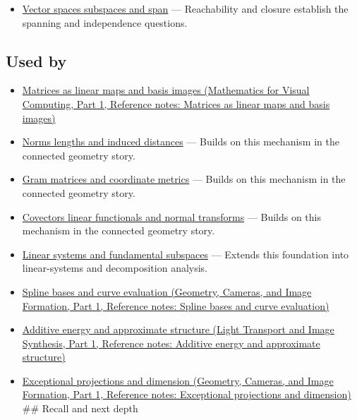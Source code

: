 \begin{itemize}
\tightlist
\item
  \hyperref[appendix-173b52c063ae]{Vector spaces subspaces and span} --- Reachability and closure establish the spanning and independence questions.
\end{itemize}

\subsection{Used by}\label{appendix-ce0341f7ea0d-used-by}

\hypertarget{appendix-ce0341f7ea0d-used-by}{}

\begin{itemize}
\item
  \href{../02-Mathematics-for-Visual-Computing-P01/main.pdf\#appendix-bd39c3bf5d64}{Matrices as linear maps and basis images (Mathematics for Visual Computing, Part 1, Reference notes: Matrices as linear maps and basis images)}
\item
  \hyperref[appendix-49933872bb51]{Norms lengths and induced distances} --- Builds on this mechanism in the connected geometry story.
\item
  \hyperref[appendix-3b863809f82a]{Gram matrices and coordinate metrics} --- Builds on this mechanism in the connected geometry story.
\item
  \hyperref[appendix-46da295c6787]{Covectors linear functionals and normal transforms} --- Builds on this mechanism in the connected geometry story.
\item
  \hyperref[appendix-8572a4a060c1]{Linear systems and fundamental subspaces} --- Extends this foundation into linear-systems and decomposition analysis.
\item
  \href{../03-Geometry-Cameras-and-Image-Formation-P01/main.pdf\#appendix-f28eeec97a3d}{Spline bases and curve evaluation (Geometry, Cameras, and Image Formation, Part 1, Reference notes: Spline bases and curve evaluation)}
\item
  \href{../04-Light-Transport-and-Image-Synthesis-P01/main.pdf\#appendix-b0732b22e7d6}{Additive energy and approximate structure (Light Transport and Image Synthesis, Part 1, Reference notes: Additive energy and approximate structure)}
\item
  \href{../03-Geometry-Cameras-and-Image-Formation-P01/main.pdf\#appendix-3c73f7862157}{Exceptional projections and dimension (Geometry, Cameras, and Image Formation, Part 1, Reference notes: Exceptional projections and dimension)} \#\# Recall and next depth
\end{itemize}

